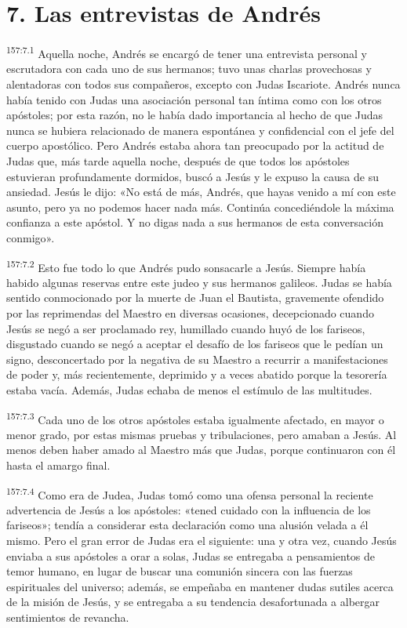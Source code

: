 \section*{7. Las entrevistas de Andrés}
\par 
\textsuperscript{157:7.1} Aquella noche, Andrés se encargó de tener una entrevista personal y escrutadora con cada uno de sus hermanos; tuvo unas charlas provechosas y alentadoras con todos sus compañeros, excepto con Judas Iscariote. Andrés nunca había tenido con Judas una asociación personal tan íntima como con los otros apóstoles; por esta razón, no le había dado importancia al hecho de que Judas nunca se hubiera relacionado de manera espontánea y confidencial con el jefe del cuerpo apostólico. Pero Andrés estaba ahora tan preocupado por la actitud de Judas que, más tarde aquella noche, después de que todos los apóstoles estuvieran profundamente dormidos, buscó a Jesús y le expuso la causa de su ansiedad. Jesús le dijo: «No está de más, Andrés, que hayas venido a mí con este asunto, pero ya no podemos hacer nada más. Continúa concediéndole la máxima confianza a este apóstol. Y no digas nada a sus hermanos de esta conversación conmigo».

\par 
\textsuperscript{157:7.2} Esto fue todo lo que Andrés pudo sonsacarle a Jesús. Siempre había habido algunas reservas entre este judeo y sus hermanos galileos. Judas se había sentido conmocionado por la muerte de Juan el Bautista, gravemente ofendido por las reprimendas del Maestro en diversas ocasiones, decepcionado cuando Jesús se negó a ser proclamado rey, humillado cuando huyó de los fariseos, disgustado cuando se negó a aceptar el desafío de los fariseos que le pedían un signo, desconcertado por la negativa de su Maestro a recurrir a manifestaciones de poder y, más recientemente, deprimido y a veces abatido porque la tesorería estaba vacía. Además, Judas echaba de menos el estímulo de las multitudes.

\par 
\textsuperscript{157:7.3} Cada uno de los otros apóstoles estaba igualmente afectado, en mayor o menor grado, por estas mismas pruebas y tribulaciones, pero amaban a Jesús. Al menos deben haber amado al Maestro más que Judas, porque continuaron con él hasta el amargo final.

\par 
\textsuperscript{157:7.4} Como era de Judea, Judas tomó como una ofensa personal la reciente advertencia de Jesús a los apóstoles: «tened cuidado con la influencia de los fariseos»; tendía a considerar esta declaración como una alusión velada a él mismo. Pero el gran error de Judas era el siguiente: una y otra vez, cuando Jesús enviaba a sus apóstoles a orar a solas, Judas se entregaba a pensamientos de temor humano, en lugar de buscar una comunión sincera con las fuerzas espirituales del universo; además, se empeñaba en mantener dudas sutiles acerca de la misión de Jesús, y se entregaba a su tendencia desafortunada a albergar sentimientos de revancha.

